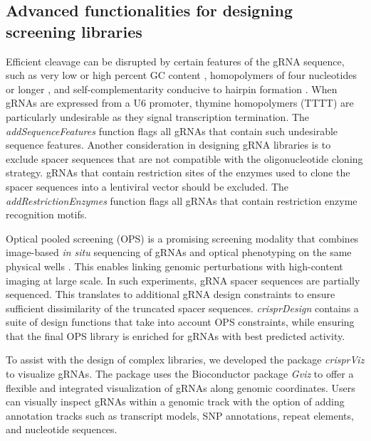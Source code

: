 \documentclass[pdftex,english,10pt]{article}
\begin{document}
\subsection*{Advanced functionalities for designing screening libraries}

Efficient cleavage can be disrupted by certain features of the gRNA sequence, such as very low or high percent GC content \citep{chen2018improved, doench2014rational, wang2014genetic}, homopolymers of four nucleotides or longer \citep{gilbert2014genomescale, pincer}, and self-complementarity conducive to hairpin formation \citep{thyme2016internal, labun2016chopchop}. When gRNAs are expressed from a U6 promoter, thymine homopolymers (TTTT) are particularly undesirable as they signal transcription termination. The \textit{addSequenceFeatures} function flags all gRNAs that contain such undesirable sequence features. Another consideration in designing gRNA libraries is to exclude spacer sequences that are not compatible with the oligonucleotide cloning strategy. gRNAs that contain restriction sites of the enzymes used to clone the spacer sequences into a lentiviral vector should be excluded. The \textit{addRestrictionEnzymes} function flags all gRNAs that contain restriction enzyme recognition motifs.

Optical pooled screening (OPS) is a promising screening modality that combines image-based \textit{in situ} sequencing of gRNAs and optical phenotyping on the same physical wells \citep{ops}. This enables linking genomic perturbations with high-content imaging at large scale. In such experiments, gRNA spacer sequences are partially sequenced. This translates to additional gRNA design constraints to ensure sufficient dissimilarity of the truncated spacer sequences.  \textit{crisprDesign} contains a suite of design functions that take into account OPS constraints, while ensuring that the final OPS library is enriched for gRNAs with best predicted activity. 


To assist with the design of complex libraries, we developed the package \textit{crisprViz} to visualize gRNAs.
The package uses the Bioconductor package \textit{Gviz} \citep{gviz} to offer a flexible and integrated visualization of gRNAs along genomic coordinates. 
Users can visually inspect gRNAs within a genomic track with the option of adding annotation tracks such as transcript models, SNP annotations, repeat elements, and nucleotide sequences. 
\end{document}
